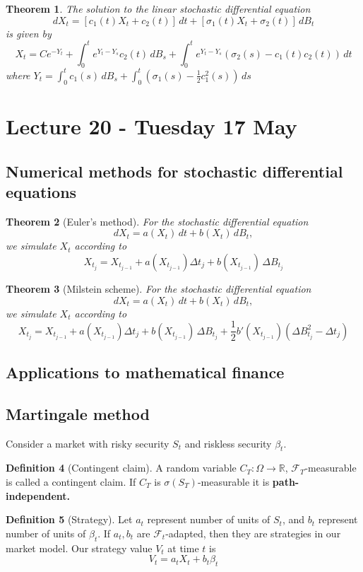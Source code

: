 \documentclass[10pt, oneside, reqno]{amsart}
\theoremstyle{plain}%
\newtheorem{thm}{Theorem}[section]
\theoremstyle{definition}
\newtheorem{defn}[thm]{Definition}
\theoremstyle{remark}
\newcommand{\R}{\mathbb{R}}
\newcommand{\sigf}{\mathcal{F}}
\begin{document}
\begin{thm}
	The solution to the linear stochastic differential equation \[
		dX_t = [ c_1(t) X_t + c_2(t)] \, dt + [ \sigma_1(t) X_t + \sigma_2(t)] \, dB_t
	\] is given by \[
		X_t = Ce^{-Y_t} + \int_0^t e^{Y_t - Y_s} c_2(t) \, dB_s + \int_0^t e^{Y_t - Y_s}(\sigma_2(s) - c_1(t) c_2(t)) \, dt
	\] where $Y_t = \int_0^t c_1(s) \, dB_s + \int_0^t \left(\sigma_1(s) - \frac{1}{2} c_1^2(s) \right) \, ds$
\end{thm}

\section{Lecture 20 - Tuesday 17 May} %
\label{sec:lecture_20_tuesday_17_may}
\subsection{Numerical methods for stochastic differential equations} %
\label{sub:numerical_methods_for_stochastic_differential_equations}

\begin{thm}[Euler's method]
	For the stochastic differential equation \[
		dX_t = a(X_t) \, dt + b(X_t) \, dB_t,
	\] we simulate $X_t$ according to \[
		X_{t_j} = X_{t_{j-1}} + a(X_{t_{j-1}}) \Delta t_j + b(X_{t_{j-1}}) \, \Delta B_{t_j}
	\]
\end{thm}
	
\begin{thm}[Milstein scheme]
	For the stochastic differential equation \[
		dX_t = a(X_t) \, dt + b(X_t) \, dB_t,
	\] we simulate $X_t$ according to \[
		X_{t_j} = X_{t_{j-1}} + a(X_{t_{j-1}}) \Delta t_j + b(X_{t_{j-1}}) \, \Delta B_{t_j} + \frac{1}{2}b'(X_{t_{j-1}})(\Delta B^2_{t_j} - \Delta t_j)
	\]
\end{thm}
\subsection{Applications to mathematical finance} %
\label{sub:applications_to_mathematical_finance}

\subsection{Martingale method} %
\label{sec:martinag}
Consider a market with risky security $S_t$ and riskless security $\beta_t$.  
\begin{defn}[Contingent claim]
	A random variable $C_T : \Omega \rightarrow \R$, $\sigf_T$-measurable is called a contingent claim.  If $C_T$ is $\sigma(S_T)$-measurable it is \textbf{path-independent.}
\end{defn}
\begin{defn}[Strategy]
	Let $a_t$ represent number of units of $S_t$, and $b_t$ represent number of units of $\beta_t$.  If $a_t, b_t$ are $\sigf_t$-adapted, then they are strategies in our market model.  Our strategy value $V_t$ at time $t$ is \[
		V_t = a_t X_t + b_t \beta_t
	\]
\end{defn}
\end{document}
